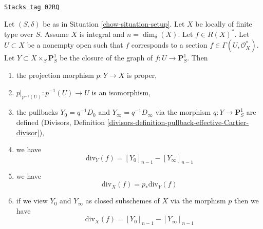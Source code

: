 \begin{lemma}
\label{chow-lemma-rational-function}
\href{https://stacks.math.columbia.edu/tag/02RQ}{\texttt{Stacks tag 02RQ}}

Let $(S, \delta)$ be as in Situation \ref{chow-situation-setup}.
Let $X$ be locally of finite type over $S$. Assume $X$ is
integral and $n = \dim_\delta(X)$. Let $f \in R(X)^*$.
Let $U \subset X$ be a nonempty open such that $f$
corresponds to a section $f \in \Gamma(U, \mathcal{O}_X^*)$.
Let $Y \subset X \times_S \mathbf{P}^1_S$ be the
closure of the graph of $f : U \to \mathbf{P}^1_S$.
Then
\begin{enumerate}
\item the projection morphism $p : Y \to X$ is proper,
\item $p|_{p^{-1}(U)} : p^{-1}(U) \to U$ is an isomorphism,
\item the pullbacks $Y_0 = q^{-1}D_0$ and $Y_\infty = q^{-1}D_\infty$
via the morphism $q : Y \to \mathbf{P}^1_S$ are defined
(Divisors, Definition
\ref{divisors-definition-pullback-effective-Cartier-divisor}),
\item we have
$$
\text{div}_Y(f) = [Y_0]_{n - 1} - [Y_\infty]_{n - 1}
$$
\item we have
$$
\text{div}_X(f) = p_*\text{div}_Y(f)
$$
\item if we view $Y_0$ and $Y_\infty$ as closed subschemes of $X$
via the morphism $p$ then we have
$$
\text{div}_X(f) = [Y_0]_{n - 1} - [Y_\infty]_{n - 1}
$$
\end{enumerate}
\end{lemma}


